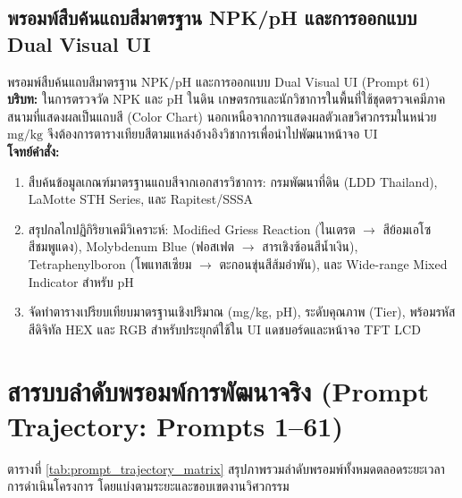 \subsection{พรอมพ์สืบค้นแถบสีมาตรฐาน NPK/pH และการออกแบบ Dual Visual UI}

\begin{promptbox}{พรอมพ์สืบค้นแถบสีมาตรฐาน NPK/pH และการออกแบบ Dual Visual UI (Prompt 61)}
\small
\textbf{บริบท:} ในการตรวจวัด NPK และ pH ในดิน เกษตรกรและนักวิชาการในพื้นที่ใช้ชุดตรวจเคมีภาคสนามที่แสดงผลเป็นแถบสี (Color Chart) นอกเหนือจากการแสดงผลตัวเลขวิศวกรรมในหน่วย $\text{mg/kg}$ จึงต้องการตารางเทียบสีตามแหล่งอ้างอิงวิชาการเพื่อนำไปพัฒนาหน้าจอ UI \\
\textbf{โจทย์คำสั่ง:}
\begin{enumerate}[leftmargin=15pt, itemsep=1pt]
    \item สืบค้นข้อมูลเกณฑ์มาตรฐานแถบสีจากเอกสารวิชาการ: กรมพัฒนาที่ดิน (LDD Thailand), LaMotte STH Series, และ Rapitest/SSSA
    \item สรุปกลไกปฏิกิริยาเคมีวิเคราะห์: Modified Griess Reaction (ไนเตรต $\to$ สีย้อมเอโซสีชมพูแดง), Molybdenum Blue (ฟอสเฟต $\to$ สารเชิงซ้อนสีน้ำเงิน), Tetraphenylboron (โพแทสเซียม $\to$ ตะกอนขุ่นสีส้มอำพัน), และ Wide-range Mixed Indicator สำหรับ pH
    \item จัดทำตารางเปรียบเทียบมาตรฐานเชิงปริมาณ (mg/kg, pH), ระดับคุณภาพ (Tier), พร้อมรหัสสีดิจิทัล HEX และ RGB สำหรับประยุกต์ใช้ใน UI แดชบอร์ดและหน้าจอ TFT LCD
\end{enumerate}
\end{promptbox}

\section{สารบบลำดับพรอมพ์การพัฒนาจริง (Prompt Trajectory: Prompts 1--61)}

ตารางที่ \ref{tab:prompt_trajectory_matrix} สรุปภาพรวมลำดับพรอมพ์ทั้งหมดตลอดระยะเวลาการดำเนินโครงการ โดยแบ่งตามระยะและขอบเขตงานวิศวกรรม

